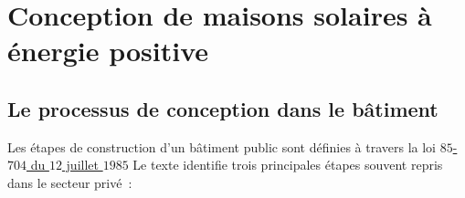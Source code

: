 \section{Conception de maisons solaires à énergie positive} %
\label{sec:conception_de_maisons_solaires_a_energie_positive}
\subsection{Le processus de conception dans le bâtiment} %
\label{sub:le_processus_de_conception_dans_le_batiment}
Les étapes de construction d’un bâtiment public sont définies à travers la loi
\href{https://www.legifrance.gouv.fr/affichTexte.do?cidTexte=JORFTEXT000000693683}{$85$-$704$ du $12$ juillet $1985$}
Le texte identifie trois principales étapes souvent repris dans le secteur privé~:
